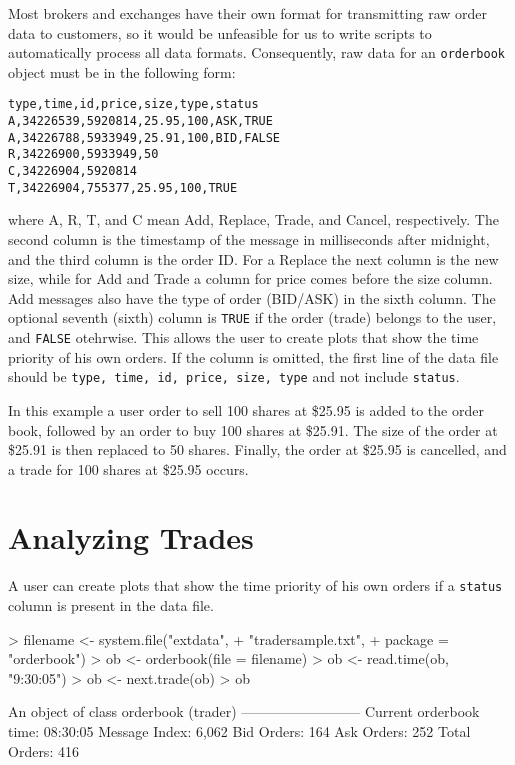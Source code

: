 \documentclass[a4paper]{report}
\begin{document}
\begin{article}
Most brokers and exchanges have their own format for transmitting raw
order data to customers, so it would be unfeasible for us to write
scripts to automatically process all data formats. Consequently, raw
data for an \texttt{orderbook} object must be in the following form:

\begin{verbatim}
type,time,id,price,size,type,status
A,34226539,5920814,25.95,100,ASK,TRUE
A,34226788,5933949,25.91,100,BID,FALSE
R,34226900,5933949,50
C,34226904,5920814
T,34226904,755377,25.95,100,TRUE
\end{verbatim}

\noindent where A, R, T, and C mean Add, Replace, Trade, and Cancel,
respectively. The second column is the timestamp of the message in
milliseconds after midnight, and the third column is the order ID. For
a Replace the next column is the new size, while for Add and Trade a
column for price comes before the size column. Add messages also have
the type of order (BID/ASK) in the sixth column. The optional seventh
(sixth) column is \texttt{TRUE} if the order (trade) belongs to the
user, and \texttt{FALSE} otehrwise. This allows the user to create
plots that show the time priority of his own orders. If the column is
omitted, the first line of the data file should be \texttt{type, time,
  id, price, size, type} and not include \texttt{status}.

In this example a user order to sell 100 shares at \$25.95 is added to the
order book, followed by an order to buy 100 shares at \$25.91. The
 size of the order at \$25.91 is then replaced to 50 shares. Finally,
 the order at \$25.95 is cancelled, and a trade for 100 shares
 at \$25.95 occurs.

\section{Analyzing Trades}

A user can create plots that show the time priority of his own orders
if a \texttt{status} column is present in the data file.

\begin{Schunk}
\begin{Sinput}
> filename <- system.file("extdata",
+                         "tradersample.txt",
+                         package = "orderbook")
> ob <- orderbook(file = filename)
> ob <- read.time(ob, "9:30:05")
> ob <- next.trade(ob)
> ob
\end{Sinput}
\begin{Soutput}
An object of class orderbook (trader)
--------------------------
Current orderbook time:    08:30:05 
Message Index:             6,062 
Bid Orders:                164 
Ask Orders:                252 
Total Orders:              416 
\end{Soutput}
\end{Schunk}


\end{article}
\end{document}
